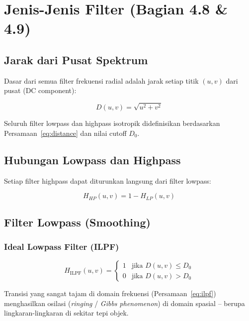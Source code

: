 \documentclass[12pt,a4paper]{article}
\begin{document}
\section{Jenis-Jenis Filter (Bagian 4.8 \& 4.9)}

\subsection{Jarak dari Pusat Spektrum}

Dasar dari semua filter frekuensi radial adalah jarak setiap titik $(u,v)$ dari
pusat (DC component):

\begin{equation}
  D(u,v) = \sqrt{u^2 + v^2}
  \label{eq:distance}
\end{equation}

Seluruh filter lowpass dan highpass isotropik didefinisikan berdasarkan
Persamaan~\eqref{eq:distance} dan nilai cutoff $D_0$.

\subsection{Hubungan Lowpass dan Highpass}

Setiap filter highpass dapat diturunkan langsung dari filter lowpass:

\begin{equation}
  H_{HP}(u,v) = 1 - H_{LP}(u,v)
  \label{eq:hp_from_lp}
\end{equation}

\subsection{Filter Lowpass (Smoothing)}

\subsubsection{Ideal Lowpass Filter (ILPF)}

\begin{equation}
  H_{\mathrm{ILPF}}(u,v) =
  \begin{cases}
    1 & \text{jika } D(u,v) \leq D_0 \\
    0 & \text{jika } D(u,v) > D_0
  \end{cases}
  \label{eq:ilpf}
\end{equation}

Transisi yang sangat tajam di domain frekuensi (Persamaan~\eqref{eq:ilpf})
menghasilkan osilasi (\textit{ringing} / \textit{Gibbs phenomenon}) di domain
spasial -- berupa lingkaran-lingkaran di sekitar tepi objek.
\end{document}
